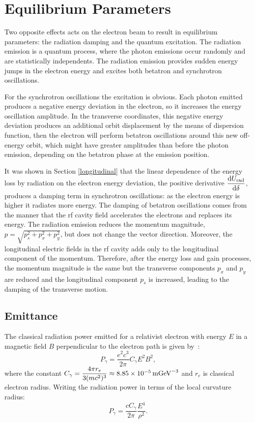\section{Equilibrium Parameters}\label{equilibrium}
Two opposite effects acts on the electron beam to result in equilibrium parameters: the radiation damping and the quantum excitation. The radiation emission is a quantum process, where the photon emissions occur randomly and are statistically independents. The radiation emission provides sudden energy jumps in the electron energy and excites both betatron and synchrotron oscillations.

For the synchrotron oscillations the excitation is obvious. Each photon emitted produces a negative energy deviation in the electron, so it increases the energy oscillation amplitude. In the transverse coordinates, this negative energy deviation produces an additional orbit displacement by the means of dispersion function, then the electron will perform betatron oscillations around this new off-energy orbit, which might have greater amplitudes than before the photon emission, depending on the betatron phase at the emission position.

It was shown in Section \ref{longitudinal} that the linear dependence of the energy loss by radiation on the electron energy deviation, the positive derivative $\dfrac{\mathrm{d} U_{\mathrm{rad}}}{\mathrm{d} \delta}$, produces a damping term in synchrotron oscillations: as the electron energy is higher it radiates more energy. The damping of betatron oscillations comes from the manner that the \gls{rf} cavity field accelerates the electrons and replaces its energy. The radiation emission reduces the momentum magnitude, $p = \sqrt{p_s
^2+ p_x^2 +p_y^2}$, but does not change the vector direction. Moreover, the longitudinal electric fields in the \gls{rf} cavity adds only to the longitudinal component of the momentum. Therefore, after the energy loss and gain processes, the momentum magnitude is the same but the transverse components $p_x$ and $p_y$ are reduced and the longitudinal component $p_s$ is increased, leading to the damping of the transverse motion.
\subsection{Emittance}
The classical radiation power emitted for a relativist electron with energy $E$ in a magnetic field $B$ perpendicular to the electron path is given by~\cite{jackson}:
\begin{equation}
    P_{\gamma} = \dfrac{e^2c^3}{2\pi} C_{\gamma} E^2 B^2,
\end{equation}
where the constant $C_{\gamma} = \dfrac{4 \pi r_e}{3 (mc^2)^3} \approx \SI{8.85e-5}{\metre {\giga \electronvolt}^{-3}}$ and $r_e$ is classical electron radius. Writing the radiation power in terms of the local curvature radius:
\begin{equation}
    P_{\gamma} = \dfrac{cC_{\gamma}}{2\pi} \dfrac{E^4}{\rho^2}.
\end{equation}

